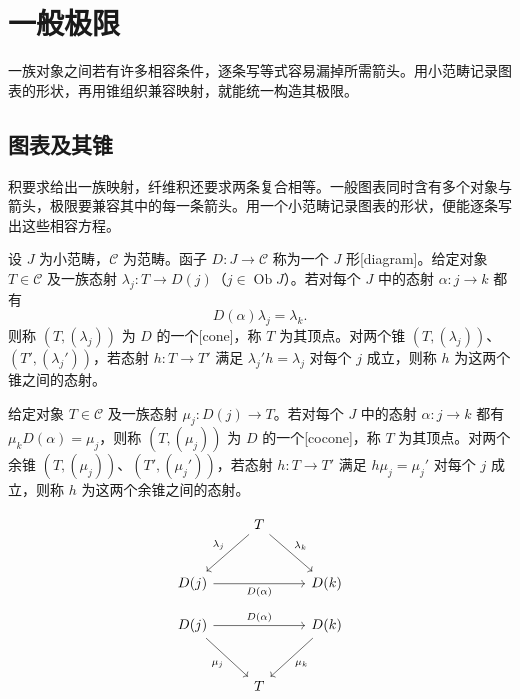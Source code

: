 
\section{一般极限}
\label{b4:sec:0202}

一族对象之间若有许多相容条件，逐条写等式容易漏掉所需箭头。用小范畴记录图表的形状，再用锥组织兼容映射，就能统一构造其极限。

%
%

\subsection{图表及其锥}
\label{b4:subsec:0202:01}

积要求给出一族映射，纤维积还要求两条复合相等。一般图表同时含有多个对象与箭头，极限要兼容其中的每一条箭头。用一个小范畴记录图表的形状，便能逐条写出这些相容方程。

\begin{definition}[图表、锥与余锥]\label{b4:def:diagram-cone}
	设 \(J\) 为小范畴，\(\mathcal C\) 为范畴。函子 \(D:J\rightarrow\mathcal C\) 称为一个 \(J\) 形[diagram]。给定对象 \(T\in\mathcal C\) 及一族态射 \(\lambda_j:T\rightarrow D(j)\)（\(j\in\operatorname{Ob}J\)）。若对每个 \(J\) 中的态射 \(\alpha:j\rightarrow k\) 都有
	\[
		D(\alpha)\lambda_j=\lambda_k.
	\]
	则称 \((T,(\lambda_j))\) 为 \(D\) 的一个[cone]，称 \(T\) 为其顶点。对两个锥 \((T,(\lambda_j))\)、\((T',(\lambda_j'))\)，若态射 \(h:T\rightarrow T'\) 满足 \(\lambda_j'h=\lambda_j\) 对每个 \(j\) 成立，则称 \(h\) 为这两个锥之间的态射。

	\ProseParagraphBreak
	给定对象 \(T\in\mathcal C\) 及一族态射 \(\mu_j:D(j)\rightarrow T\)。若对每个 \(J\) 中的态射 \(\alpha:j\rightarrow k\) 都有 \(\mu_kD(\alpha)=\mu_j\)，则称 \((T,(\mu_j))\) 为 \(D\) 的一个[cocone]，称 \(T\) 为其顶点。对两个余锥 \((T,(\mu_j))\)、\((T',(\mu_j'))\)，若态射 \(h:T\rightarrow T'\) 满足 \(h\mu_j=\mu_j'\) 对每个 \(j\) 成立，则称 \(h\) 为这两个余锥之间的态射。
\end{definition}

\[
	\begin{tikzcd}[column sep=2.5em,row sep=large]
		&T\arrow[dl,"\lambda_j"']\arrow[dr,"\lambda_k"]&\\
		D(j)\arrow[rr,"D(\alpha)"']&&D(k)
	\end{tikzcd}
\]
\[
	\begin{tikzcd}[column sep=2.5em,row sep=large]
		D(j)\arrow[rr,"D(\alpha)"]\arrow[dr,"\mu_j"']&&D(k)\arrow[dl,"\mu_k"]\\
		&T&
	\end{tikzcd}
\]

